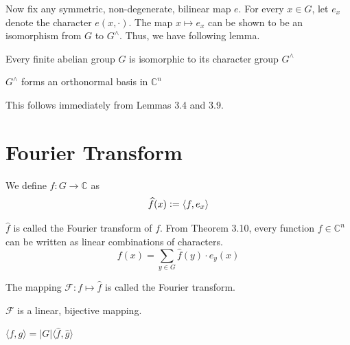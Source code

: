 Now fix any symmetric, non-degenerate, bilinear map $e$. For every $x \in G$, let $e_x$ denote the character $e(x,\cdot)$. The map $x \mapsto e_x$ can be shown to be an isomorphism from $G$ to $G^\land$. Thus, we have following lemma.

\begin{lemma}
Every finite abelian group $G$ is isomorphic to its character group $G^\land$
\end{lemma}

\begin{theorem}
$G^\land$ forms an orthonormal basis in $\mathbb{C}^n$
\end{theorem}
This follows immediately from Lemmas 3.4 and 3.9.
\section{Fourier Transform}
\begin{definition}
We define $\widehat{f} : G \rightarrow \mathbb{C}$ as
$$\widehat{f}(x) \vcentcolon= \langle f, e_x \rangle $$
\end{definition}
$\widehat{f}$ is called the Fourier transform of $f$.
From Theorem 3.10, every function $f \in \mathbb{C}^n$ can be written as linear combinations of characters. 
$$f(x) = \sum\limits_{y \in G} \widehat{f}(y) \cdot e_y(x)$$

\begin{definition}
The mapping $\mathcal{F} : f \mapsto \widehat{f}$ is called the Fourier transform. 
\end{definition}

\begin{fact}
$\mathcal{F}$ is a linear, bijective mapping. 
\end{fact}

\begin{prop}
$\langle f, g \rangle = |G| \langle \widehat{f}, \widehat{g} \rangle$
\end{prop}

